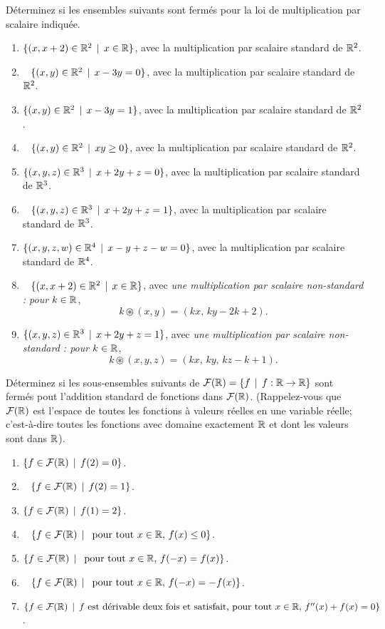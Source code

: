 \begin{prob} \label{prob04.2} Déterminez si les
ensembles suivants sont fermés pour la loi de multiplication par scalaire indiquée.

\begin{enumerate}
\item
  $\{(x, x+2) \in \mathbb{R}^2\, \mid \, x\in \mathbb{R}\}$, avec la multiplication par scalaire standard de $\mathbb{R}^2$.
\item\sov~
  $\{(x, y) \in \mathbb{R}^2\, \mid \, x -3y=0 \}$, avec la multiplication par scalaire standard de $\mathbb{R}^2$.
\item
  $\{(x, y) \in \mathbb{R}^2\, \mid \, x -3y=1 \}$, avec la multiplication par scalaire standard de $\mathbb{R}^2$.
\item\sov~
  $\{(x, y) \in \mathbb{R}^2\, \mid \, xy \ge 0 \}$, avec  la multiplication par scalaire standard de $\mathbb{R}^2$.
\item
  $\{(x, y, z) \in \mathbb{R}^3\, \mid \, x+2y+z=0 \}$, avec la multiplication par scalaire standard de  $\mathbb{R}^3$.
\item\sov~
  $\{(x, y, z) \in \mathbb{R}^3\, \mid \, x+2y+z=1 \}$, avec la multiplication par scalaire standard de $\mathbb{R}^3$.
\item
  $\{(x, y, z, w) \in \mathbb{R}^4\, \mid \, x-y+z-w=0 \}$, avec la multiplication par scalaire standard de  $\mathbb{R}^4$.
\item\sov~
  $\{(x, x+2) \in \mathbb{R}^2\, \mid \, x\in \mathbb{R}\}$, avec {\emph{une multiplication par scalaire non-standard : pour $k\in \mathbb{R}$}},
  \[k\circledast (x,y)=(kx,\, ky-2k+2).\]
\item
  $\{(x, y, z) \in \mathbb{R}^3\, \mid \, x+2y+z=1 \}$, avec {\emph{une multiplication par scalaire non-standard : pour $k\in \mathbb{R}$}},
  \[k\circledast (x,y,z)=(kx, \,ky,\, kz-k+1).\]
\end{enumerate}
\end{prob}

\begin{prob} \label{prob04.3}  Déterminez si les
sous-ensembles suivants de $\mathcal{F}(\mathbb{R})=\{f \, \mid \, f: \mathbb{R} \to \mathbb{R}\}$ sont
fermés pout l'addition standard de fonctions dans $\mathcal{F}(\mathbb{R})$.
(Rappelez-vous que $\mathcal{F}(\mathbb{R})$ est l'espace de toutes les fonctions à
valeurs réelles en une variable réelle; c'est-à-dire toutes les fonctions
avec domaine exactement $\mathbb{R}$ et dont les valeurs sont dans $\mathbb{R}$).

\begin{enumerate}
\item
  $\{f \in \mathcal{F}(\mathbb{R}) \, \mid \, f(2)=0 \}$.
\item\sov~
  $\{f \in \mathcal{F}(\mathbb{R}) \, \mid \, f(2)=1 \}$.
\item
  $\{f \in \mathcal{F}(\mathbb{R}) \, \mid \, f(1)=2 \}$.
\item\sov~
  $\{f \in \mathcal{F}(\mathbb{R}) \, \mid \, \text{ pour tout } x\in \mathbb{R},   \, f(x)\le 0\}$.
\item
  $\{f \in \mathcal{F}(\mathbb{R}) \, \mid \, \text{ pour tout } x\in \mathbb{R},   \, f(-x)= f(x)\}$.
\item\sov~
  $\{f \in \mathcal{F}(\mathbb{R}) \, \mid \, \text{ pour tout } x\in \mathbb{R},   \, f(-x)= -f(x)\}$.
\item
  $\{f \in \mathcal{F}(\mathbb{R})   \, \mid \, \text{$f$ est dérivable deux fois et satisfait, pour tout } x\in \mathbb{R},   \, f''(x)+ f(x)=0\}$.
\end{enumerate}
\end{prob}

